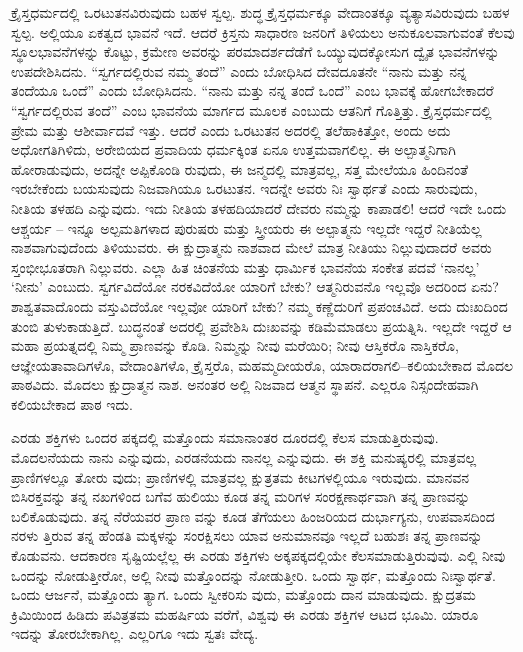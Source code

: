 ಕ್ರೈಸ್ತಧರ್ಮದಲ್ಲಿ ಒರಟುತನವಿರುವುದು ಬಹಳ ಸ್ವಲ್ಪ. ಶುದ್ಧ ಕ್ರೈಸ್ತಧರ್ಮಕ್ಕೂ ವೇದಾಂತಕ್ಕೂ ವ್ಯತ್ಯಾಸವಿರುವುದು ಬಹಳ ಸ್ವಲ್ಪ. ಅಲ್ಲಿಯೂ ಏಕತ್ವದ ಭಾವನೆ ಇದೆ. ಆದರೆ ಕ್ರಿಸ್ತನು ಸಾಧಾರಣ ಜನರಿಗೆ ತಿಳಿಯಲು ಅನುಕೂಲವಾಗುವಂತೆ ಕೆಲವು ಸ್ಥೂಲಭಾವನೆಗಳನ್ನು ಕೊಟ್ಟು, ಕ್ರಮೇಣ ಅವರನ್ನು ಪರಮಾದರ್ಶದೆಡೆಗೆ ಒಯ್ಯುವುದಕ್ಕೋಸುಗ ದ್ವೈತ ಭಾವನೆಗಳನ್ನು ಉಪದೇಶಿಸಿದನು. “ಸ್ವರ್ಗದಲ್ಲಿರುವ ನಮ್ಮ ತಂದೆ” ಎಂದು ಬೋಧಿಸಿದ ದೇವದೂತನೇ “ನಾನು ಮತ್ತು ನನ್ನ ತಂದೆಯೂ ಒಂದೆ” ಎಂದು ಬೋಧಿಸಿದನು. “ನಾನು ಮತ್ತು ನನ್ನ ತಂದೆ ಒಂದೆ” ಎಂಬ ಭಾವಕ್ಕೆ ಹೋಗಬೇಕಾದರೆ “ಸ್ವರ್ಗದಲ್ಲಿರುವ ತಂದೆ” ಎಂಬ ಭಾವನೆಯ ಮಾರ್ಗದ ಮೂಲಕ ಎಂಬುದು ಆತನಿಗೆ ಗೊತ್ತಿತ್ತು. ಕ್ರೈಸ್ತಧರ್ಮದಲ್ಲಿ ಪ್ರೇಮ ಮತ್ತು ಆಶೀರ್ವಾದವೆ ಇತ್ತು. ಆದರೆ ಎಂದು ಒರಟುತನ ಅದರಲ್ಲಿ ತಲೆಹಾಕಿತ್ತೋ, ಅಂದು ಅದು ಅಧೋಗತಿಗಿಳಿದು, ಅರೇಬಿಯದ ಪ್ರವಾದಿಯ ಧರ್ಮಕ್ಕಿಂತ ಏನೂ ಉತ್ತಮವಾಗಲಿಲ್ಲ. ಈ ಅಲ್ಪಾತ್ಮನಿಗಾಗಿ ಹೋರಾಡುವುದು, ಅದನ್ನೇ ಅಪ್ಪಿಕೊಂಡಿ ರುವುದು, ಈ ಜನ್ಮದಲ್ಲಿ ಮಾತ್ರವಲ್ಲ, ಸತ್ತ ಮೇಲೆಯೂ ಹಿಂದಿನಂತೆ ಇರಬೇಕೆಂದು ಬಯಸುವುದು ನಿಜವಾಗಿಯೂ ಒರಟುತನ. ಇದನ್ನೇ ಅವರು ನಿಃ ಸ್ವಾರ್ಥತೆ ಎಂದು ಸಾರುವುದು, ನೀತಿಯ ತಳಹದಿ ಎನ್ನುವುದು. ಇದು ನೀತಿಯ ತಳಹದಿಯಾದರೆ ದೇವರು ನಮ್ಮನ್ನು ಕಾಪಾಡಲಿ! ಆದರೆ ಇದೇ ಒಂದು ಆಶ್ಚರ್ಯ – ಇನ್ನೂ ಅಲ್ಪಮತಿಗಳಾದ ಪುರುಷರು ಮತ್ತು ಸ್ತ್ರೀಯರು ಈ ಅಲ್ಪಾತ್ಮನು ಇಲ್ಲದೇ ಇದ್ದರೆ ನೀತಿಯೆಲ್ಲ ನಾಶವಾಗುವುದೆಂದು ತಿಳಿಯುವರು. ಈ ಕ್ಷುದ್ರಾತ್ಮನು ನಾಶವಾದ ಮೇಲೆ ಮಾತ್ರ ನೀತಿಯು ನಿಲ್ಲುವುದಾದರೆ ಅವರು ಸ್ತಂಭೀಭೂತರಾಗಿ ನಿಲ್ಲುವರು. ಎಲ್ಲಾ ಹಿತ ಚಿಂತನೆಯ ಮತ್ತು ಧಾರ್ಮಿಕ ಭಾವನೆಯ ಸಂಕೇತ ಪದವೆ ‘ನಾನಲ್ಲ’ ‘ನೀನು’ ಎಂಬುದು. ಸ್ವರ್ಗವಿದೆಯೋ ನರಕವಿದೆಯೋ ಯಾರಿಗೆ ಬೇಕು? ಆತ್ಮನಿರುವನೊ ಇಲ್ಲವೊ ಅದರಿಂದ ಏನು? ಶಾಶ್ವತವಾದೊಂದು ವಸ್ತುವಿದೆಯೋ ಇಲ್ಲವೋ ಯಾರಿಗೆ ಬೇಕು? ನಮ್ಮ ಕಣ್ಣೆದುರಿಗೆ ಪ್ರಪಂಚವಿದೆ. ಅದು ದುಃಖದಿಂದ ತುಂಬಿ ತುಳುಕಾಡುತ್ತಿದೆ. ಬುದ್ಧನಂತೆ ಅದರಲ್ಲಿ ಪ್ರವೇಶಿಸಿ ದುಃಖವನ್ನು ಕಡಿಮೆಮಾಡಲು ಪ್ರಯತ್ನಿಸಿ. ಇಲ್ಲದೇ ಇದ್ದರೆ ಆ ಮಹಾ ಪ್ರಯತ್ನದಲ್ಲಿ ನಿಮ್ಮ ಪ್ರಾಣವನ್ನು ಕೊಡಿ. ನಿಮ್ಮನ್ನು ನೀವು ಮರೆಯಿರಿ; ನೀವು ಆಸ್ತಿಕರೊ ನಾಸ್ತಿಕರೊ, ಆಜ್ಞೇಯತಾವಾದಿಗಳೊ, ವೇದಾಂತಿಗಳೊ, ಕ್ರೈಸ್ತರೊ, ಮಹಮ್ಮದೀಯರೊ, ಯಾರಾದರಾಗಲಿ–ಕಲಿಯಬೇಕಾದ ಮೊದಲ ಪಾಠವಿದು. ಮೊದಲು ಕ್ಷುದ್ರಾತ್ಮನ ನಾಶ. ಅನಂತರ ಅಲ್ಲಿ ನಿಜವಾದ ಆತ್ಮನ ಸ್ಥಾಪನೆ. ಎಲ್ಲರೂ ನಿಸ್ಸಂದೇಹವಾಗಿ ಕಲಿಯಬೇಕಾದ ಪಾಠ ಇದು.

ಎರಡು ಶಕ್ತಿಗಳು ಒಂದರ ಪಕ್ಕದಲ್ಲಿ ಮತ್ತೊಂದು ಸಮಾನಾಂತರ ದೂರದಲ್ಲಿ ಕೆಲಸ ಮಾಡುತ್ತಿರುವುವು. ಮೊದಲನೆಯದು ನಾನು ಎನ್ನುವುದು, ಎರಡನೆಯದು ನಾನಲ್ಲ ಎನ್ನುವುದು. ಈ ಶಕ್ತಿ ಮನುಷ್ಯರಲ್ಲಿ ಮಾತ್ರವಲ್ಲ ಪ್ರಾಣಿಗಳಲ್ಲೂ ತೋರು ವುದು; ಪ್ರಾಣಿಗಳಲ್ಲಿ ಮಾತ್ರವಲ್ಲ ಕ್ಷುತ್ರತಮ ಕೀಟಗಳಲ್ಲಿಯೂ ಇರುವುದು. ಮಾನವನ ಬಿಸಿರಕ್ತವನ್ನು ತನ್ನ ನಖಗಳಿಂದ ಬಗೆವ ಹುಲಿಯು ಕೂಡ ತನ್ನ ಮರಿಗಳ ಸಂರಕ್ಷಣಾರ್ಥವಾಗಿ ತನ್ನ ಪ್ರಾಣವನ್ನು ಬಲಿಕೊಡುವುದು. ತನ್ನ ನೆರೆಯವರ ಪ್ರಾಣ ವನ್ನು ಕೂಡ ತೆಗೆಯಲು ಹಿಂಜರಿಯದ ದುರ್ಭಾಗ್ಯನು, ಉಪವಾಸದಿಂದ ನರಳು ತ್ತಿರುವ ತನ್ನ ಹೆಂಡತಿ ಮಕ್ಕಳನ್ನು ಸಂರಕ್ಷಿಸಲು ಯಾವ ಅನುಮಾನವೂ ಇಲ್ಲದೆ ಬಹುಶಃ ತನ್ನ ಪ್ರಾಣವನ್ನು ಕೊಡುವನು. ಆದಕಾರಣ ಸೃಷ್ಟಿಯಲ್ಲೆಲ್ಲ ಈ ಎರಡು ಶಕ್ತಿಗಳು ಅಕ್ಕಪಕ್ಕದಲ್ಲಿಯೇ ಕೆಲಸಮಾಡುತ್ತಿರುವುವು. ಎಲ್ಲಿ ನೀವು ಒಂದನ್ನು ನೋಡುತ್ತೀರೋ, ಅಲ್ಲಿ ನೀವು ಮತ್ತೊಂದನ್ನು ನೋಡುತ್ತೀರಿ. ಒಂದು ಸ್ವಾರ್ಥ, ಮತ್ತೊಂದು ನಿಃಸ್ವಾರ್ಥತೆ. ಒಂದು ಆರ್ಜನೆ, ಮತ್ತೊಂದು ತ್ಯಾಗ. ಒಂದು ಸ್ವೀಕರಿಸು ವುದು, ಮತ್ತೊಂದು ದಾನ ಮಾಡುವುದು. ಕ್ಷುದ್ರತಮ ಕ್ರಿಮಿಯಿಂದ ಹಿಡಿದು ಪವಿತ್ರತಮ ಮಹರ್ಷಿಯ ವರೆಗೆ, ವಿಶ್ವವು ಈ ಎರಡು ಶಕ್ತಿಗಳ ಆಟದ ಭೂಮಿ. ಯಾರೂ ಇದನ್ನು ತೋರಬೇಕಾಗಿಲ್ಲ. ಎಲ್ಲರಿಗೂ ಇದು ಸ್ವತಃ ವೇದ್ಯ.

